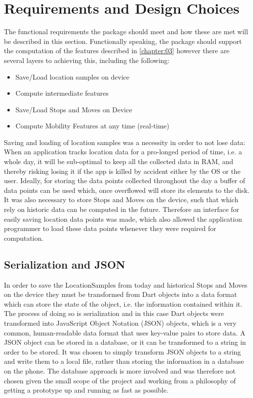 \section{Requirements and Design Choices}
The functional requirements the package should meet and how these are met will be described in this section. Functionally speaking, the package should support the computation of the features described in \ref{chapter:03} however there are several layers to achieving this, including the following:

\begin{itemize}
    \item Save/Load location samples on device
    \item Compute intermediate features
    \item Save/Load Stops and Moves on Device
    \item Compute Mobility Features at any time (real-time)
\end{itemize}

Saving and loading of location samples was a necessity in order to not lose data: When an application tracks location data for a pro-longed period of time, i.e. a whole day, it will be sub-optimal to keep all the collected data in RAM, and thereby risking losing it if the app is killed by accident either by the OS or the user. Ideally, for storing the data points collected throughout the day a buffer of data points can be used which, once overflowed will store its elements to the disk. It was also necessary to store Stops and Moves on the device, such that which rely on historic data can be computed in the future. Therefore an interface for easily saving location data points was made, which also allowed the application programmer to load these data points whenever they were required for computation. 

\subsection{Serialization and JSON}
In order to save the LocationSamples from today and historical Stops and Moves on the device they must be transformed from Dart objects into a data format which can store the state of the object, i.e. the information contained within it. The process of doing so is serialization and in this case Dart objects were transformed into JavaScript Object Notation (JSON) objects, which is a very common, human-readable data format that uses key-value pairs to store data. A JSON object can be stored in a database, or it can be transformed to a string in order to be stored. It was chosen to simply transform JSON objects to a string and write them to a local file, rather than storing the information in a database on the phone. The database approach is more involved and was therefore not chosen given the small scope of the project and working from a philosophy of getting a prototype up and running as fast as possible.

